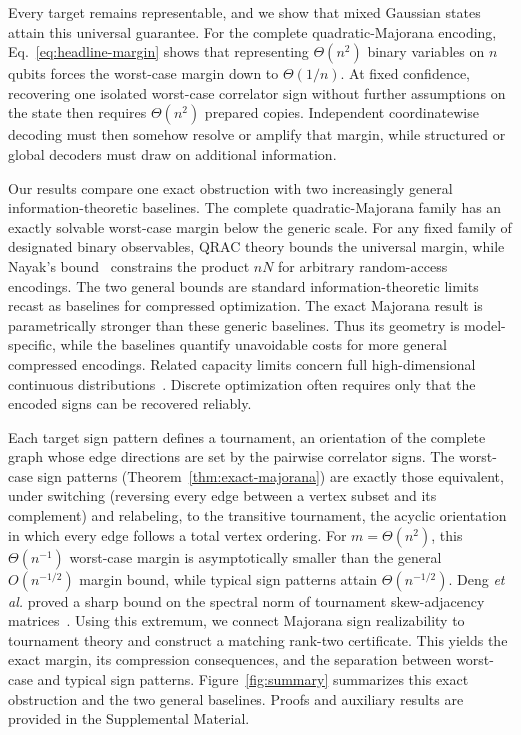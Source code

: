 \documentclass[10pt,aps,pra,twocolumn,superscriptaddress,nofootinbib,longbibliography]{revtex4-2}
\begin{document}
Every target remains representable, and we show that mixed Gaussian states attain this universal guarantee.  For the complete quadratic-Majorana encoding, Eq.~\eqref{eq:headline-margin} shows that representing $\Theta(n^2)$ binary variables on $n$ qubits forces the worst-case margin down to $\Theta(1/n)$.  At fixed confidence, recovering one isolated worst-case correlator sign without further assumptions on the state then requires $\Theta(n^2)$ prepared copies.  Independent coordinatewise decoding must then somehow resolve or amplify that margin, while structured or global decoders must draw on additional information.

Our results compare one exact obstruction with two increasingly general information-theoretic baselines.  The complete quadratic-Majorana family has an exactly solvable worst-case margin below the generic scale.  For any fixed family of designated binary observables, QRAC theory bounds the universal margin, while Nayak's bound~\cite{Nayak1999QRAC} constrains the product $nN$ for arbitrary random-access encodings.  The two general bounds are standard information-theoretic limits recast as baselines for compressed optimization.  The exact Majorana result is parametrically stronger than these generic baselines.  Thus its geometry is model-specific, while the baselines quantify unavoidable costs for more general compressed encodings.  Related capacity limits concern full high-dimensional continuous distributions~\cite{Barthe2025ExpectationSamplers}.  Discrete optimization often requires only that the encoded signs can be recovered reliably.

Each target sign pattern defines a tournament, an orientation of the complete graph whose edge directions are set by the pairwise correlator signs.  The worst-case sign patterns (Theorem~\ref{thm:exact-majorana}) are exactly those equivalent, under switching (reversing every edge between a vertex subset and its complement) and relabeling, to the transitive tournament, the acyclic orientation in which every edge follows a total vertex ordering.  For $m=\Theta(n^2)$, this $\Theta(n^{-1})$ worst-case margin is asymptotically smaller than the general $O(n^{-1/2})$ margin bound, while typical sign patterns attain $\Theta(n^{-1/2})$.  Deng \emph{et al.} proved a sharp bound on the spectral norm of tournament skew-adjacency matrices~\cite{Deng2018Tournament}.  Using this extremum, we connect Majorana sign realizability to tournament theory and construct a matching rank-two certificate.  This yields the exact margin, its compression consequences, and the separation between worst-case and typical sign patterns.  Figure~\ref{fig:summary} summarizes this exact obstruction and the two general baselines.  Proofs and auxiliary results are provided in the Supplemental Material.
\end{document}
